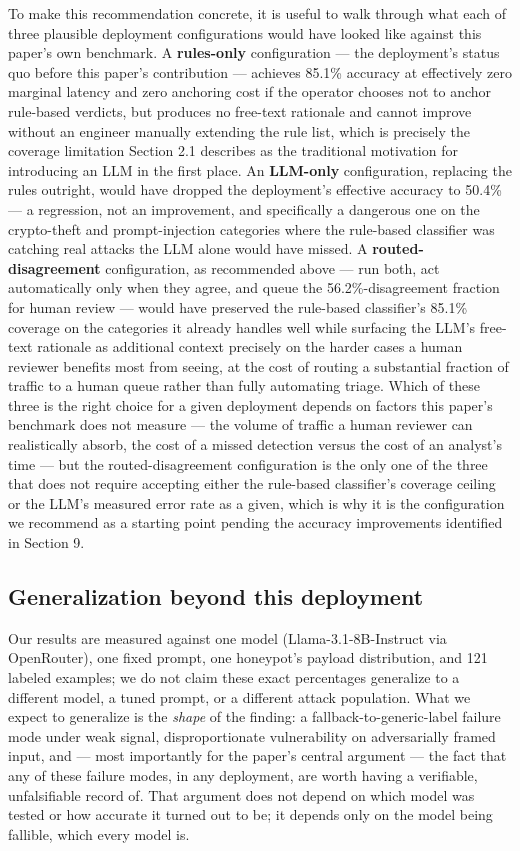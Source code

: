 \documentclass[journal,10pt,twocolumn]{IEEEtran}
\begin{document}
To make this recommendation concrete, it is useful to walk through what each of three plausible deployment configurations would have looked like against this paper's own benchmark. A \textbf{rules-only} configuration --- the deployment's status quo before this paper's contribution --- achieves 85.1\% accuracy at effectively zero marginal latency and zero anchoring cost if the operator chooses not to anchor rule-based verdicts, but produces no free-text rationale and cannot improve without an engineer manually extending the rule list, which is precisely the coverage limitation Section 2.1 describes as the traditional motivation for introducing an LLM in the first place. An \textbf{LLM-only} configuration, replacing the rules outright, would have dropped the deployment's effective accuracy to 50.4\% --- a regression, not an improvement, and specifically a dangerous one on the crypto-theft and prompt-injection categories where the rule-based classifier was catching real attacks the LLM alone would have missed. A \textbf{routed-disagreement} configuration, as recommended above --- run both, act automatically only when they agree, and queue the 56.2\%-disagreement fraction for human review --- would have preserved the rule-based classifier's 85.1\% coverage on the categories it already handles well while surfacing the LLM's free-text rationale as additional context precisely on the harder cases a human reviewer benefits most from seeing, at the cost of routing a substantial fraction of traffic to a human queue rather than fully automating triage. Which of these three is the right choice for a given deployment depends on factors this paper's benchmark does not measure --- the volume of traffic a human reviewer can realistically absorb, the cost of a missed detection versus the cost of an analyst's time --- but the routed-disagreement configuration is the only one of the three that does not require accepting either the rule-based classifier's coverage ceiling or the LLM's measured error rate as a given, which is why it is the configuration we recommend as a starting point pending the accuracy improvements identified in Section 9.

\subsection{Generalization beyond this deployment}

Our results are measured against one model (Llama-3.1-8B-Instruct via OpenRouter), one fixed prompt, one honeypot's payload distribution, and 121 labeled examples; we do not claim these exact percentages generalize to a different model, a tuned prompt, or a different attack population. What we expect to generalize is the \emph{shape} of the finding: a fallback-to-generic-label failure mode under weak signal, disproportionate vulnerability on adversarially framed input, and --- most importantly for the paper's central argument --- the fact that any of these failure modes, in any deployment, are worth having a verifiable, unfalsifiable record of. That argument does not depend on which model was tested or how accurate it turned out to be; it depends only on the model being fallible, which every model is.
\end{document}
